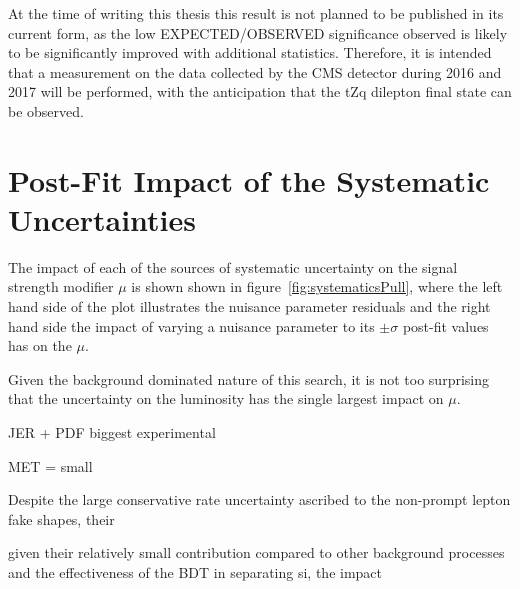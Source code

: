 At the time of writing this thesis this result is not planned to be published in its current form, as the low EXPECTED/OBSERVED significance observed is likely to be significantly improved with additional statistics.
Therefore, it is intended that a measurement on the data collected by the CMS detector during 2016 and 2017 will be performed, with the anticipation that the tZq dilepton final state can be observed.

\section{Post-Fit Impact of the Systematic Uncertainties}\label{sec:uncertainitiesImpact}
The impact of each of the sources of systematic uncertainty on the signal strength modifier $\mu$ is shown shown in figure~\ref{fig:systematicsPull}, where the left hand side of the plot illustrates the nuisance parameter residuals and the right hand side the impact of varying a nuisance parameter to its $\pm \sigma$ post-fit values has on the $\mu$.

Given the background dominated nature of this search, it is not too surprising that the uncertainty on the luminosity has the single largest impact on $\mu$.
%

%

JER + PDF biggest experimental  
 
MET = small 
 
Despite the large conservative rate uncertainty ascribed to the non-prompt lepton fake shapes, 
their

given their relatively small contribution compared to other background processes and the effectiveness of the BDT in separating si, the impact 

